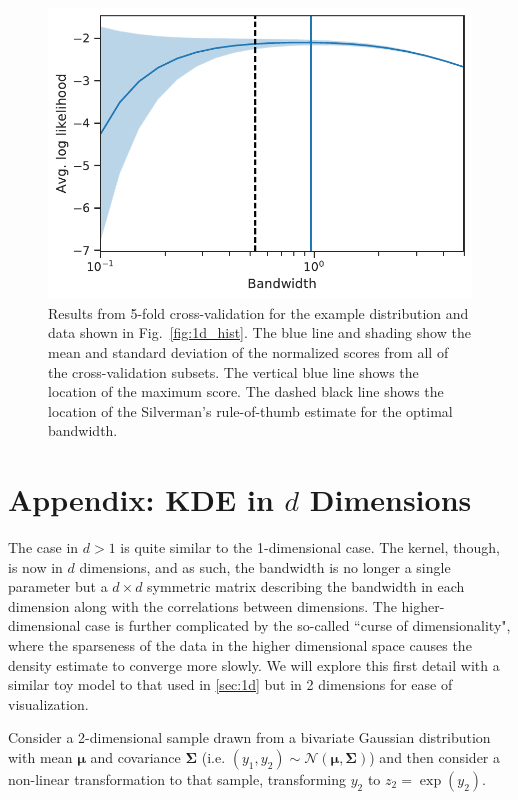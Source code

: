 \begin{figure}
    \centering
    \includegraphics{figures/snemo_kde/1d_bandwidth_example.pdf}
    \caption{Results from 5-fold cross-validation for the example distribution and data shown in Fig.~\ref{fig:1d_hist}. The blue line and shading show the mean and standard deviation of the normalized scores from all of the cross-validation subsets. The vertical blue line shows the location of the maximum score. The dashed black line shows the location of the Silverman's rule-of-thumb estimate for the optimal bandwidth.}
    \label{fig:1d_bandwidth_opt}
\end{figure}

\section[KDE in d Dimensions]{Appendix: KDE in $d$ Dimensions}
\label{sec:2d}
The case in $d>1$ is quite similar to the 1-dimensional case. The kernel, though, is now in $d$ dimensions, and as such, the bandwidth is no longer a single parameter but a $d\times d$ symmetric matrix describing the bandwidth in each dimension along with the correlations between dimensions. The higher-dimensional case is further complicated by the so-called ``curse of dimensionality", where the sparseness of the data in the higher dimensional space causes the density estimate to converge more slowly. We will explore this first detail with a similar toy model to that used in \ref{sec:1d} but in 2 dimensions for ease of visualization.

Consider a 2-dimensional sample drawn from a bivariate Gaussian distribution with mean $\bm{\mu}$ and covariance $\bm{\Sigma}$ (i.e. $(y_1, y_2)\sim\mathcal{N}(\bm{\mu}, \bm{\Sigma})$) and then consider a non-linear transformation to that sample, transforming $y_2$ to $z_2 = \exp(y_2)$. 

